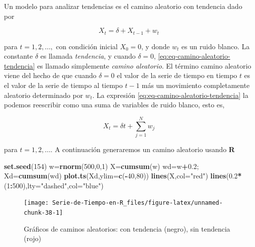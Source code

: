 \documentclass[12pt,]{krantz}
\makeatletter
\newenvironment{Shaded}{\begin{snugshade}}{\end{snugshade}}
\newcommand{\KeywordTok}[1]{\textcolor[rgb]{0.13,0.29,0.53}{\textbf{#1}}}
\newcommand{\DataTypeTok}[1]{\textcolor[rgb]{0.13,0.29,0.53}{#1}}
\newcommand{\DecValTok}[1]{\textcolor[rgb]{0.00,0.00,0.81}{#1}}
\newcommand{\FloatTok}[1]{\textcolor[rgb]{0.00,0.00,0.81}{#1}}
\newcommand{\StringTok}[1]{\textcolor[rgb]{0.31,0.60,0.02}{#1}}
\newcommand{\OperatorTok}[1]{\textcolor[rgb]{0.81,0.36,0.00}{\textbf{#1}}}
\newcommand{\NormalTok}[1]{#1}
\newenvironment{kframe}{%
\medskip{}
\setlength{\fboxsep}{.8em}
 \def\at@end@of@kframe{}%
 \ifinner\ifhmode%
  \def\at@end@of@kframe{\end{minipage}}%
  \begin{minipage}{\columnwidth}%
 \fi\fi%
 \def\FrameCommand##1{\hskip\@totalleftmargin \hskip-\fboxsep
 \colorbox{shadecolor}{##1}\hskip-\fboxsep
     \hskip-\linewidth \hskip-\@totalleftmargin \hskip\columnwidth}%
 \MakeFramed {\advance\hsize-\width
   \@totalleftmargin\z@ \linewidth\hsize
   \@setminipage}}%
 {\par\unskip\endMakeFramed%
 \at@end@of@kframe}
\renewenvironment{Shaded}{\begin{kframe}}{\end{kframe}}
\theoremstyle{definition}
\theoremstyle{definition}
\theoremstyle{definition}
\theoremstyle{remark}
\let\BeginKnitrBlock\begin \let\EndKnitrBlock\end
\makeatother
\begin{document}
\BeginKnitrBlock{example}
\protect\hypertarget{exm:ejem-camino-aleatorio}{}{\label{exm:ejem-camino-aleatorio}
}Un modelo para analizar tendencias es el camino aleatorio con tendencia
dado por

\begin{equation}
X_t = \delta+X_{t-1}+w_t
\label{eq:eq-camino-aleatorio-tendencia}
\end{equation}

para \(t=1,2,\ldots,\) con condición inicial \(X_0=0\), y donde \(w_t\)
es un ruido blanco. La constante \(\delta\) es llamada \emph{tendencia},
y cuando \(\delta=0\), \eqref{eq:eq-camino-aleatorio-tendencia} es llamado
simplemente \emph{camino aleatorio}. El término camino aleatorio viene
del hecho de que cuando \(\delta=0\) el valor de la serie de tiempo en
tiempo \(t\) es el valor de la serie de tiempo al tiempo \(t-1\) más un
movimiento completamente aleatorio determinado por \(w_t\). La expresión
\eqref{eq:eq-camino-aleatorio-tendencia} la podemos reescribir como una
suma de variables de ruido blanco, esto es,

\begin{equation}
X_t = \delta t+\sum_{j=1}^Nw_j
\label{eq:eq-camino-aleatorio-suma}
\end{equation}

para \(t=1,2,\ldots.\) A continuación generaremos un camino aleatorio
usando \textbf{R}
\EndKnitrBlock{example}

\begin{Shaded}
\begin{Highlighting}[]
\KeywordTok{set.seed}\NormalTok{(}\DecValTok{154}\NormalTok{)}
\NormalTok{w=}\KeywordTok{rnorm}\NormalTok{(}\DecValTok{500}\NormalTok{,}\DecValTok{0}\NormalTok{,}\DecValTok{1}\NormalTok{)}
\NormalTok{X=}\KeywordTok{cumsum}\NormalTok{(w)}
\NormalTok{wd=w}\OperatorTok{+}\FloatTok{0.2}\NormalTok{; Xd=}\KeywordTok{cumsum}\NormalTok{(wd)}
\KeywordTok{plot.ts}\NormalTok{(Xd,}\DataTypeTok{ylim=}\KeywordTok{c}\NormalTok{(}\OperatorTok{-}\DecValTok{40}\NormalTok{,}\DecValTok{80}\NormalTok{))}
\KeywordTok{lines}\NormalTok{(X,}\DataTypeTok{col=}\StringTok{"red"}\NormalTok{)}
\KeywordTok{lines}\NormalTok{(}\FloatTok{0.2}\OperatorTok{*}\NormalTok{(}\DecValTok{1}\OperatorTok{:}\DecValTok{500}\NormalTok{),}\DataTypeTok{lty=}\StringTok{"dashed"}\NormalTok{,}\DataTypeTok{col=}\StringTok{"blue"}\NormalTok{)}
\end{Highlighting}
\end{Shaded}

\begin{figure}

{\centering \texttt{[image: Serie-de-Tiempo-en-R\_files/figure-latex/unnamed-chunk-38-1]} 

}

\caption{Gráficos de caminos aleatorios: con tendencia (negro), sin tendencia (rojo)}\label{fig:unnamed-chunk-38}
\end{figure}
\end{document}
